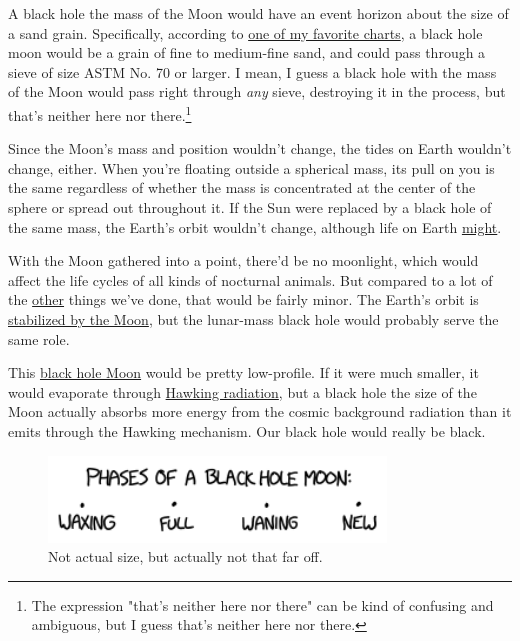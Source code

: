 {{A black hole the mass of the Moon would have an event horizon about the size of a sand grain. Specifically, according to \href{http://pubs.usgs.gov/of/2003/of03-001/htmldocs/images/chart.pdf}{one of my favorite charts}, a black hole moon would be a grain of fine to medium-fine sand, and could pass through a sieve of size ASTM No. 70 or larger. I mean, I guess a black hole with the mass of the Moon would pass right through \emph{any} sieve, destroying it in the process, but that's neither here nor there.{\footnote{The expression "that's neither here nor there" can be kind of confusing and ambiguous, but I guess that's neither here nor there.} } }

{Since the Moon's mass and position wouldn't change, the tides on Earth wouldn't change, either. When you're floating outside a spherical mass, its pull on you is the same regardless of whether the mass is concentrated at the center of the sphere or spread out throughout it. If the Sun were replaced by a black hole of the same mass, the Earth's orbit wouldn't change, although life on Earth \href{http://what-if.xkcd.com/49/}{might}.}

{With the Moon gathered into a point, there'd be no moonlight, which would affect the life cycles of all kinds of nocturnal animals. But compared to a lot of the \href{http://xkcd.com/1338/}{other} things we've done, that would be fairly minor. The Earth's orbit is \href{http://www.nature.com/nature/journal/v361/n6413/abs/361615a0.html} {stabilized by the Moon}, but the lunar-mass black hole would probably serve the same role.}

{This \href{https://www.youtube.com/watch?v=3mbBbFH9fAg}{black hole Moon} would be pretty low-profile. If it were much smaller, it would evaporate through \href{http://en.wikipedia.org/wiki/Hawking\_radiation} {Hawking radiation}, but a black hole the size of the Moon actually absorbs more energy from the cosmic background radiation than it emits through the Hawking mechanism. Our black hole would really be black.}

\begin{figure}[!htbp]
\centering
\includegraphics[scale=0.5, max width=0.8\textwidth]{imgs/a/129/phases.png}
\caption{Not actual size, but actually not that far off.}
\end{figure}

}
